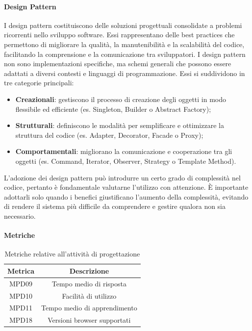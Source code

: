 \documentclass[10pt]{article}
\begin{document}
\begin{justify}
        \paragraph{Design Pattern}
        I design pattern costituiscono delle soluzioni progettuali consolidate a problemi ricorrenti nello sviluppo software. Essi rappresentano delle best practices che permettono di migliorare la qualità, la manutenibilità e la scalabilità del codice, facilitando la comprensione e la comunicazione tra sviluppatori. I design pattern non sono implementazioni specifiche, ma schemi generali che possono essere adattati a diversi contesti e linguaggi di programmazione. Essi si suddividono in tre categorie principali:
        \begin{itemize}
            \item \textbf{Creazionali}: gestiscono il processo di creazione degli oggetti in modo flessibile ed efficiente (es. Singleton, Builder o Abstract Factory);
            \item \textbf{Strutturali}: definiscono le modalità per semplificare e ottimizzare la struttura del codice (es. Adapter, Decorator, Facade o Proxy);
            \item \textbf{Comportamentali}: migliorano la comunicazione e cooperazione tra gli oggetti (es. Command, Iterator, Observer, Strategy o Template Method).
        \end{itemize}
        L'adozione dei design pattern può introdurre un certo grado di complessità nel codice, pertanto è fondamentale valutarne l'utilizzo con attenzione. È importante adottarli solo quando i benefici giustificano l'aumento della complessità, evitando di rendere il sistema più difficile da comprendere e gestire qualora non sia necessario.

        \paragraph{Metriche}
        \begin{table}[H]
          \centering
          \begin{tabular}{|c|c|}
            \hline
            \textbf{Metrica} & \textbf{Descrizione} \\
            \hline
            MPD09 & Tempo medio di risposta\\
            \hline
            MPD10 & Facilità di utilizzo\\
            \hline
            MPD11 & Tempo medio di apprendimento\\
            \hline
            MPD18 & Versioni browser supportati\\
            \hline
          \end{tabular}
          \caption{Metriche relative all'attività di progettazione}
        \end{table}


\end{justify}
\end{document}
